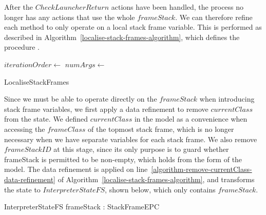 After the $CheckLauncherReturn$ actions have been handled, the process
no longer has any actions that use the whole $frameStack$.
We can therefore refine each method to only operate on a local stack
frame variable.
This is performed as described in
Algorithm~\ref{localise-stack-frames-algorithm}, which defines the
procedure .

\begin{algorithm}
  \begin{algorithmic}[1]
    \arraycolsep=0cm
    \State {}
    \label{algorithm-remove-currentClass-data-refinement}
    \State $iterationOrder \gets$ 
    \label{algorithm-method-dependency-order-call}
    \label{algorithm-localise-stack-frames-loop}
    \State $numArgs \gets$ 
    \State {}
    \label{algorithm-arguments-introduction}
    \State {}
    \label{algorithm-redefine-method-action-to-include-parameters}
    \State {}
    \label{algorithm-HandleReturnEPC-stackFrame-introduction-rule}
    \EndFor
  \end{algorithmic}
  \caption{LocaliseStackFrames}
  \label{localise-stack-frames-algorithm}
\end{algorithm}
 
Since we must be able to operate directly on the $frameStack$ when
introducing stack frame variables, we first apply a data refinement to
remove $currentClass$ from the state.
We defined $currentClass$ in the model as a convenience when accessing
the $frameClass$ of the topmost stack frame, which is no longer
necessary when we have separate variables for each stack frame.
We also remove $frameStackID$ at this stage, since its only purpose is
to guard whether frameStack is permitted to be non-empty, which holds
from the form of the model.
The data refinement is applied on
line~\ref{algorithm-remove-currentClass-data-refinement} of
Algorithm~\ref{localise-stack-frames-algorithm}, and transforms the
state to $InterpreterStateFS$, shown below, which only contains
$frameStack$.
\begin{schema}{InterpreterStateFS}
  frameStack : StackFrameEPC
\end{schema}

